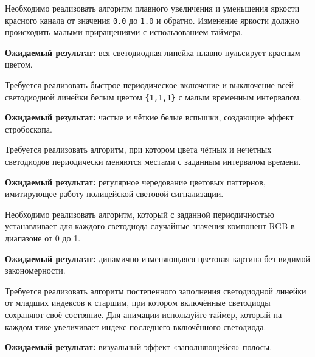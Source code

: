 \begin{taskbox}
\indent Необходимо реализовать алгоритм плавного увеличения и уменьшения яркости красного канала от значения \verb|0.0| до \verb|1.0| и обратно. Изменение яркости должно происходить малыми приращениями с использованием таймера.

\noindent\textbf{Ожидаемый результат:} вся светодиодная линейка плавно пульсирует красным цветом.
\end{taskbox}

\begin{taskbox}
\indent Требуется реализовать быстрое периодическое включение и выключение всей светодиодной линейки белым цветом \verb|{1,1,1}| с малым временным интервалом.

\noindent\textbf{Ожидаемый результат:} частые и чёткие белые вспышки, создающие эффект стробоскопа.
\end{taskbox}

\begin{taskbox}
\indent Требуется реализовать алгоритм, при котором цвета чётных и нечётных светодиодов периодически меняются местами с заданным интервалом времени.

\noindent\textbf{Ожидаемый результат:} регулярное чередование цветовых паттернов, имитирующее работу полицейской световой сигнализации.
\end{taskbox}

\begin{taskbox}
\indent Необходимо реализовать алгоритм, который с заданной периодичностью устанавливает для каждого светодиода случайные значения компонент RGB в диапазоне от 0 до 1.

\noindent\textbf{Ожидаемый результат:} динамично изменяющаяся цветовая картина без видимой закономерности.
\end{taskbox}

\begin{taskbox}
\indent Требуется реализовать алгоритм постепенного заполнения светодиодной линейки от младших индексов к старшим, при котором включённые светодиоды сохраняют своё состояние. Для анимации используйте таймер, который на каждом тике увеличивает индекс последнего включённого светодиода.

\noindent\textbf{Ожидаемый результат:} визуальный эффект «заполняющейся» полосы.
\end{taskbox}

